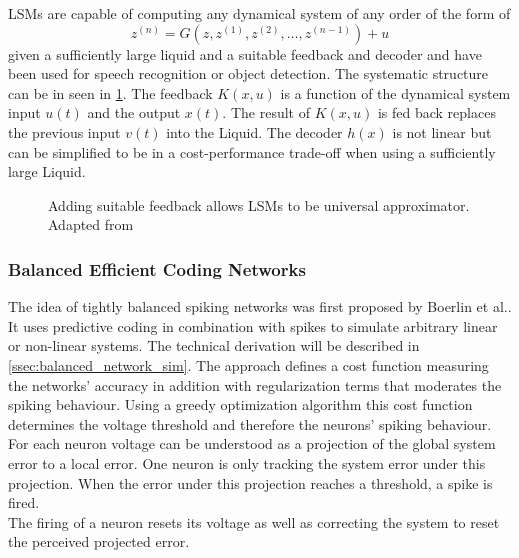 \acp{LSM} are capable of computing any dynamical system of any order of the form of
\begin{equation}
	z^{(n)} = G(z,z^{(1)},z^{(2)},\dots,z^{(n-1)}) + u
\end{equation}
given a sufficiently large liquid and a suitable feedback and decoder\cite{maass_computational_2004} and have been used for speech recognition\cite{jin_performance_2017}\cite{zhang_digital_2015} or object detection\cite{soures_deep_2019}. The systematic structure can be in seen in \cref{fig:LSM_feedback}. The feedback $K(x,u)$ is a function of the dynamical system input $u(t)$ and the output $x(t)$. The result of $K(x,u)$ is fed back replaces the previous input $v(t)$ into the Liquid. The decoder $h(x)$ is not linear but can be simplified to be in a cost-performance trade-off when using a sufficiently large Liquid.\\
\begin{figure}[htbp]
	\centering
	
	\caption{Adding suitable feedback allows \acp{LSM} to be universal approximator. Adapted from \cite{maass_computational_2007}}
	\label{fig:LSM_feedback}
\end{figure}

\subsubsection{Balanced Efficient Coding Networks}
The idea of tightly balanced spiking networks was first proposed by Boerlin et al.\cite{boerlin_predictive_2013}. It uses predictive coding in combination with spikes to simulate arbitrary linear or non-linear systems\cite{alemi_learning_2017}.
The technical derivation will be described in \cref{ssec:balanced_network_sim}. The approach defines a cost function measuring the networks' accuracy in addition with regularization terms that moderates the spiking behaviour. Using a greedy optimization algorithm this cost function determines the voltage threshold and therefore the neurons' spiking behaviour.\\
For each neuron voltage can be understood as a projection of the global system error to a local error. One neuron is only tracking the system error under this projection. When the error under this projection reaches a threshold, a spike is fired.\\
The firing of a neuron resets its voltage as well as correcting the system to reset the perceived projected error.\\

